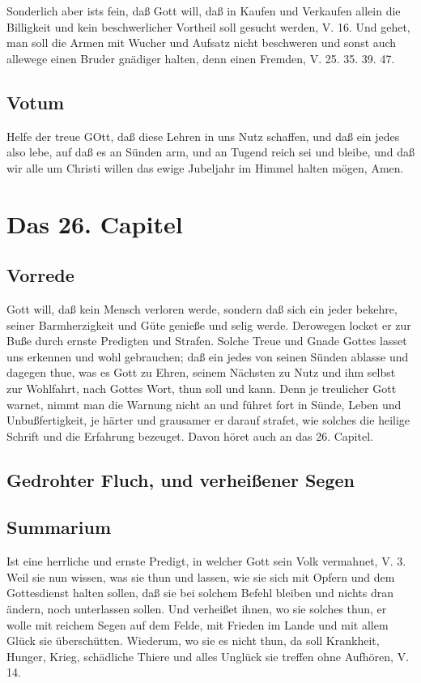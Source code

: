 Sonderlich aber ists fein, daß Gott will, daß in Kaufen und Verkaufen allein die Billigkeit und kein beschwerlicher Vortheil soll gesucht werden, V. 16. Und gehet, man soll die Armen mit Wucher und Aufsatz nicht beschweren und sonst auch allewege einen Bruder gnädiger halten, denn einen Fremden, V. 25. 35. 39. 47.

\section{Votum}

Helfe der treue GOtt, daß diese Lehren in uns Nutz schaffen, und daß ein jedes also lebe, auf daß es an Sünden arm, und an Tugend reich sei und bleibe, und daß wir alle um Christi willen das ewige Jubeljahr im Himmel halten mögen, Amen.

\chapter{Das 26. Capitel}

\section{Vorrede}

Gott will, daß kein Mensch verloren werde, sondern daß sich ein jeder bekehre, seiner Barmherzigkeit und Güte genieße und selig werde. Derowegen locket er zur Buße durch ernste Predigten und Strafen. Solche Treue und Gnade Gottes lasset uns erkennen und wohl gebrauchen; daß ein jedes von seinen Sünden ablasse und dagegen thue, was es Gott zu Ehren, seinem Nächsten zu Nutz und ihm selbst zur Wohlfahrt, nach Gottes Wort, thun soll und kann. Denn je treulicher Gott warnet, nimmt man die Warnung nicht an und führet fort in Sünde, Leben und Unbußfertigkeit, je härter und grausamer er darauf strafet, wie solches die heilige Schrift und die Erfahrung bezeuget. Davon höret auch an das 26. Capitel.

\section{Gedrohter Fluch, und verheißener Segen}

\section{Summarium}

Ist eine herrliche und ernste Predigt, in welcher Gott sein Volk vermahnet, V. 3. Weil sie nun wissen, was sie thun und lassen, wie sie sich mit Opfern und dem Gottesdienst halten sollen, daß sie bei solchem Befehl bleiben und nichts dran ändern, noch unterlassen sollen. Und verheißet ihnen, wo sie solches thun, er wolle mit reichem Segen auf dem Felde, mit Frieden im Lande und mit allem Glück sie überschütten. Wiederum, wo sie es nicht thun, da soll Krankheit, Hunger, Krieg, schädliche Thiere und alles Unglück sie treffen ohne Aufhören, V. 14.

